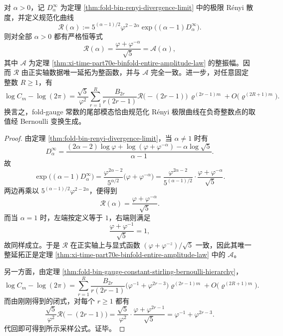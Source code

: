 \begin{theorem}\label{thm:xi-time-part70e-renyi-curve-negative-odd-sampling}
对 \(\alpha>0\)，记 \(D_\alpha^\infty\) 为定理 \ref{thm:fold-bin-renyi-divergence-limit} 中的极限 Rényi 散度，并定义规范化曲线
\[
\mathcal R(\alpha):=
5^{(\alpha-1)/2}\varphi^{2-2\alpha}
\exp\!\bigl((\alpha-1)D_\alpha^\infty\bigr).
\]
则对全部 \(\alpha>0\) 都有严格恒等式
\[
\mathcal R(\alpha)=\frac{\varphi+\varphi^{-\alpha}}{\sqrt5}=\mathcal A(\alpha),
\]
其中 \(\mathcal A\) 为定理 \ref{thm:xi-time-part70e-binfold-entire-amplitude-law} 的整振幅。因而 \(\mathcal R\) 由正实轴数据唯一延拓为整函数，并与 \(\mathcal A\) 完全一致。进一步，对任意固定整数 \(R\ge 1\)，有
\[
\log C_m-\log(2\pi)
=
\frac{\sqrt5}{\varphi^2}
\sum_{r=1}^{R}
\frac{B_{2r}}{r(2r-1)}
\mathcal R\bigl(-(2r-1)\bigr)\,
\varrho^{(2r-1)m}
+
O\!\bigl(\varrho^{(2R+1)m}\bigr).
\]
换言之，fold-gauge 常数的尾部模态恰由规范化 Rényi 极限曲线在负奇整数点的取值经 Bernoulli 变换生成。
\end{theorem}
\begin{proof}
由定理 \ref{thm:fold-bin-renyi-divergence-limit}，当 \(\alpha\neq 1\) 时有
\[
D_\alpha^\infty
=
\frac{(2\alpha-2)\log\varphi+\log(\varphi+\varphi^{-\alpha})-\alpha\log\sqrt5}{\alpha-1}.
\]
故
\[
\exp\!\bigl((\alpha-1)D_\alpha^\infty\bigr)
=
\frac{\varphi^{2\alpha-2}}{5^{\alpha/2}}
\bigl(\varphi+\varphi^{-\alpha}\bigr)
=
\frac{\varphi^{2\alpha-2}}{5^{(\alpha-1)/2}}
\cdot
\frac{\varphi+\varphi^{-\alpha}}{\sqrt5}.
\]
两边再乘以 \(5^{(\alpha-1)/2}\varphi^{2-2\alpha}\)，便得到
\[
\mathcal R(\alpha)=\frac{\varphi+\varphi^{-\alpha}}{\sqrt5}.
\]
而当 \(\alpha=1\) 时，左端按定义等于 \(1\)，右端则满足
\[
\frac{\varphi+\varphi^{-1}}{\sqrt5}=1,
\]
故同样成立。于是 \(\mathcal R\) 在正实轴上与显式函数 \((\varphi+\varphi^{-z})/\sqrt5\) 一致，因此其唯一整延拓正是定理 \ref{thm:xi-time-part70e-binfold-entire-amplitude-law} 中的 \(\mathcal A\)。

另一方面，由定理 \ref{thm:fold-bin-gauge-constant-stirling-bernoulli-hierarchy}，
\[
\log C_m-\log(2\pi)
=
\sum_{r=1}^{R}
\frac{B_{2r}}{r(2r-1)}
\bigl(\varphi^{-1}+\varphi^{2r-3}\bigr)\varrho^{(2r-1)m}
+O\!\bigl(\varrho^{(2R+1)m}\bigr).
\]
而由刚刚得到的闭式，对每个 \(r\ge 1\) 都有
\[
\frac{\sqrt5}{\varphi^2}\mathcal R\bigl(-(2r-1)\bigr)
=
\frac{\sqrt5}{\varphi^2}\cdot
\frac{\varphi+\varphi^{2r-1}}{\sqrt5}
=
\varphi^{-1}+\varphi^{2r-3}.
\]
代回即可得到所示采样公式。证毕。
\end{proof}


